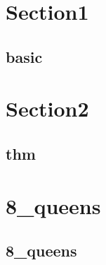 \section{Section1}
    \subsection{basic}
        

\section{Section2}
    \subsection{thm}
        
        
\section{8_queens}
    \subsection{8_queens}
        

